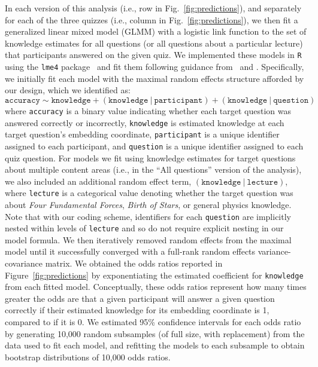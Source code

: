 \documentclass[10pt]{article}
\begin{document}
In each version of this analysis (i.e., row in Fig.~\ref{fig:predictions}), and
separately for each of the three quizzes (i.e., column in
Fig.~\ref{fig:predictions}), we then fit a generalized linear mixed model
(GLMM) with a logistic link function to the set of knowledge estimates for all
questions (or all questions about a particular lecture) that participants
answered on the given quiz. We implemented these models in \texttt{R} using the
\texttt{lme4} package~\citep{BateEtal15a} and fit them following guidance
from~\cite{BateEtal15b} and \cite{MatuEtal17}. Specifically, we initially fit
each model with the maximal random effects structure afforded by our design,
which we identified as:
\[
    \mathtt{accuracy \sim knowledge + (knowledge\ \vert\ participant) + (knowledge\ \vert\ question)}
\]
where \texttt{accuracy} is a binary value indicating whether each target
question was answered correctly or incorrectly, \texttt{knowledge} is
estimated knowledge at each target question's embedding coordinate,
\texttt{participant} is a unique identifier assigned to each participant,
and \texttt{question} is a unique identifier assigned to each quiz
question. For models we fit using knowledge estimates for target questions
about multiple content areas (i.e., in the ``All questions'' version of the
analysis), we also included an additional random effect term,
$\mathtt{(knowledge\ \vert\ lecture)}$, where \texttt{lecture} is a
categorical value denoting whether the target question was about \textit{Four
Fundamental Forces}, \textit{Birth of Stars}, or general physics knowledge.
Note that with our coding scheme, identifiers for each \texttt{question} are
implicitly nested within levels of \texttt{lecture} and so do not require
explicit nesting in our model formula. We then iteratively removed random
effects from the maximal model until it successfully converged with a full-rank
random effects variance-covariance matrix. We obtained the odds ratios reported
in Figure~\ref{fig:predictions} by exponentiating the estimated coefficient for
\texttt{knowledge} from each fitted model. Conceptually, these odds ratios
represent how many times greater the odds are that a given participant will
answer a given question correctly if their estimated knowledge for its embedding
coordinate is 1, compared to if it is 0. We estimated 95\% confidence intervals
for each odds ratio by generating 10,000 random subsamples (of full size, with
replacement) from the data used to fit each model, and refitting the models to
each subsample to obtain bootstrap distributions of 10,000 odds ratios.
\end{document}
